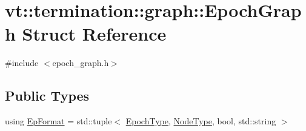 \hypertarget{structvt_1_1termination_1_1graph_1_1_epoch_graph}{}\section{vt\+:\+:termination\+:\+:graph\+:\+:Epoch\+Graph Struct Reference}
\label{structvt_1_1termination_1_1graph_1_1_epoch_graph}


{\ttfamily \#include $<$epoch\+\_\+graph.\+h$>$}

\subsection*{Public Types}
\begin{DoxyCompactItemize}
\item 
using \hyperlink{structvt_1_1termination_1_1graph_1_1_epoch_graph_a127b9f54d98b9645451c2d9a2821d10e}{Ep\+Format} = std\+::tuple$<$ \hyperlink{namespacevt_a985a5adf291c34a3ca263b3378388236}{Epoch\+Type}, \hyperlink{namespacevt_a866da9d0efc19c0a1ce79e9e492f47e2}{Node\+Type}, bool, std\+::string $>$
\end{DoxyCompactItemize}
